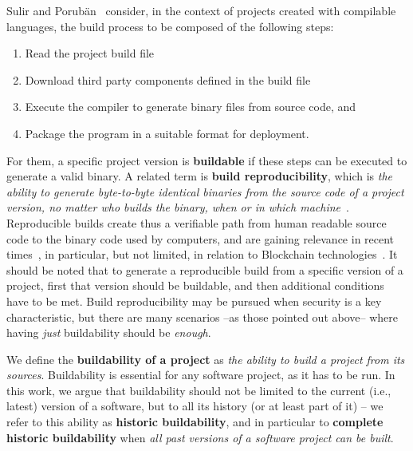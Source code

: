 


Sulir and Porub\"an~\cite{Sulir:2016:QSJ:3001878.3001882} consider, in the context of projects created with compilable languages, the build process to be composed of the following steps:

\begin{enumerate}
	\item Read the project build file
	\item Download third party components defined in the build file
	\item Execute the compiler to generate  binary files from source code, and
	\item Package the program in a suitable format for deployment.
\end{enumerate}

For them, a specific project version is {\bf buildable} if these steps can be executed to generate a valid binary.
A related term is {\bf build reproducibility}, which is \emph{the ability to generate byte-to-byte identical binaries from the source code of a project version, no matter who builds the binary, when or in which machine}~\cite{RepBldsDebian:2018:Online}.
Reproducible builds create thus a verifiable path from human readable source code to the binary code used by computers, and are gaining relevance in recent times~\cite{cito2017empirical, maudoux2018correct}, in particular, but not limited, in relation to Blockchain technologies~\cite{deCarnedeCarnavalet:2014:CIV:2664243.2664288, perry2014reproducible}.
It should be noted that to generate a reproducible build from a specific version of a project, first that version should be buildable, and then additional conditions have to be met.
Build reproducibility may be pursued when security is a key characteristic, but there are many scenarios --as those pointed out above-- where having \emph{just} buildability should be \emph{enough}.

We define the {\bf buildability of a project} as \emph{the ability to build a project from its sources}.
Buildability is essential for any software project, as it has to be run.
In this work, we argue that buildability should not be limited to the current (i.e., latest) version of a software, but to all its history (or at least part of it) -- we refer to this ability as {\bf historic buildability}, and in particular to {\bf complete historic buildability} when \emph{all past versions of a software project can be built}.

